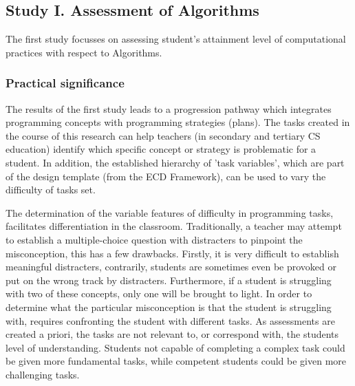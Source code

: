 \subsection{Study I. Assessment of Algorithms}
The first study focusses on assessing student's attainment level of computational practices with respect to Algorithms. %
%


\subsubsection*{Practical significance}

The results of the first study leads to a progression pathway which integrates programming concepts with programming strategies (plans). The tasks created in the course of this research can help teachers (in secondary and tertiary CS education) identify which specific concept or strategy is problematic for a student. In addition, the established hierarchy of 'task variables', which are part of the design template (from the ECD Framework), can be used to vary the difficulty of tasks set.


The determination of the variable features of difficulty in programming tasks, facilitates differentiation in the classroom.  Traditionally, a teacher may attempt to establish a multiple-choice question with distracters to pinpoint the misconception, this has a few drawbacks. Firstly, it is very difficult to establish meaningful distracters, contrarily, students are sometimes even be provoked or put on the wrong track by distracters. Furthermore, if a student is struggling with two of these concepts, only one will be brought to light. In order to determine what the particular misconception is that the student is struggling with, requires confronting the student with different tasks. As assessments are created a priori, the tasks are not relevant to, or correspond with, the students level of understanding. Students not capable of completing a complex task could be given more fundamental tasks, while competent students could be given more challenging tasks.


